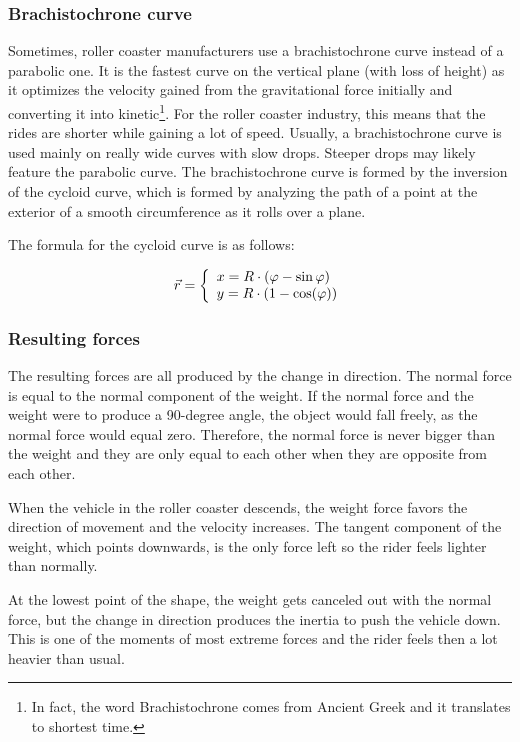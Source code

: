 \documentclass[12pt,twoside,a4paper]{article}
\newcommand{\hr}{\noindent\hrulefill}
\newcommand{\ds}{\displaystyle}
\renewcommand{\phi}{\varphi}
\renewcommand{\quote}[1]{\og#1\fg{}}
\begin{document}
	\subsubsection*{Brachistochrone curve}
	Sometimes, roller coaster manufacturers use a brachistochrone curve instead of a parabolic one. It is the fastest curve on the vertical plane (with loss of height) as it optimizes the velocity gained from the gravitational force initially and converting it into kinetic\footnote{In fact, the word Brachistochrone comes from Ancient Greek and it translates to \quote{shortest time}.}. For the roller coaster industry, this means that the rides are shorter while gaining a lot of speed. Usually, a brachistochrone curve is used mainly on really wide curves with slow drops. Steeper drops may likely feature the parabolic curve. The brachistochrone curve is formed by the inversion of the cycloid curve, which is formed by analyzing the path of a point at the exterior of a smooth circumference as it rolls over a plane.
	
	The formula for the cycloid curve is as follows:
	
	$$\ds \vec{r} = \left\{\begin{array}{l} x = R \cdot (\phi - \sin\phi) \cr y = R \cdot (1 - \cos(\phi)) \end{array}\right.$$
	
	\hr

	\subsubsection{Resulting forces}
	The resulting forces are all produced by the change in direction. The normal force is equal to the normal component of the weight. If the normal force and the weight were to produce a 90-degree angle, the object would fall freely, as the normal force would equal zero. Therefore, the normal force is never bigger than the weight and they are only equal to each other when they are opposite from each other.
	
	When the vehicle in the roller coaster descends, the weight force favors the direction of movement and the velocity increases. The tangent component of the weight, which points downwards, is the only force left so the rider feels lighter than normally.
	
	At the lowest point of the shape, the weight gets canceled out with the normal force, but the change in direction produces the inertia to push the vehicle down. This is one of the moments of most extreme forces and the rider feels then a lot heavier than usual.
	
\end{document}
